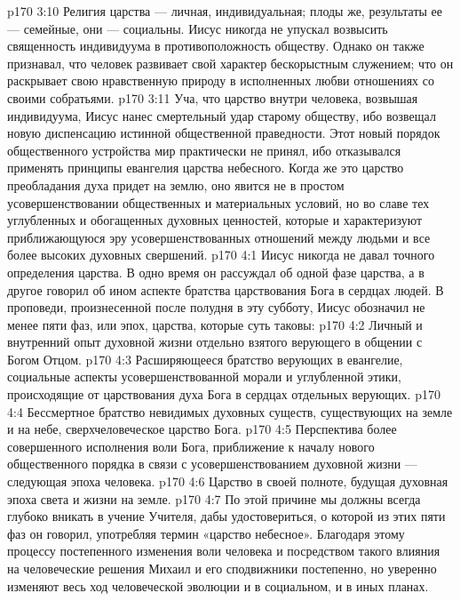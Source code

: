 \vs p170 3:10 Религия царства --- личная, индивидуальная; плоды же, результаты ее --- семейные, они --- социальны. Иисус никогда не упускал возвысить священность индивидуума в противоположность обществу. Однако он также признавал, что человек развивает свой характер бескорыстным служением; что он раскрывает свою нравственную природу в исполненных любви отношениях со своими собратьями.
\vs p170 3:11 Уча, что царство внутри человека, возвышая индивидуума, Иисус нанес смертельный удар старому обществу, ибо возвещал новую диспенсацию истинной общественной праведности. Этот новый порядок общественного устройства мир практически не принял, ибо отказывался применять принципы евангелия царства небесного. Когда же это царство преобладания духа придет на землю, оно явится не в простом усовершенствовании общественных и материальных условий, но во славе тех углубленных и обогащенных духовных ценностей, которые и характеризуют приближающуюся эру усовершенствованных отношений между людьми и все более высоких духовных свершений.
\vs p170 4:1 Иисус никогда не давал точного определения царства. В одно время он рассуждал об одной фазе царства, а в другое говорил об ином аспекте братства царствования Бога в сердцах людей. В проповеди, произнесенной после полудня в эту субботу, Иисус обозначил не менее пяти фаз, или эпох, царства, которые суть таковы:
\vs p170 4:2 \bibnobreakspace Личный и внутренний опыт духовной жизни отдельно взятого верующего в общении с Богом Отцом.
\vs p170 4:3 \pc {}\bibnobreakspace Расширяющееся братство верующих в евангелие, социальные аспекты усовершенствованной морали и углубленной этики, происходящие от царствования духа Бога в сердцах отдельных верующих.
\vs p170 4:4 \pc {}\bibnobreakspace Бессмертное братство невидимых духовных существ, существующих на земле и на небе, сверхчеловеческое царство Бога.
\vs p170 4:5 \pc {}\bibnobreakspace Перспектива более совершенного исполнения воли Бога, приближение к началу нового общественного порядка в связи с усовершенствованием духовной жизни --- следующая эпоха человека.
\vs p170 4:6 \pc {}\bibnobreakspace Царство в своей полноте, будущая духовная эпоха света и жизни на земле.
\vs p170 4:7 \pc По этой причине мы должны всегда глубоко вникать в учение Учителя, дабы удостовериться, о которой из этих пяти фаз он говорил, употребляя термин «царство небесное». Благодаря этому процессу постепенного изменения воли человека и посредством такого влияния на человеческие решения Михаил и его сподвижники постепенно, но уверенно изменяют весь ход человеческой эволюции и в социальном, и в иных планах.
